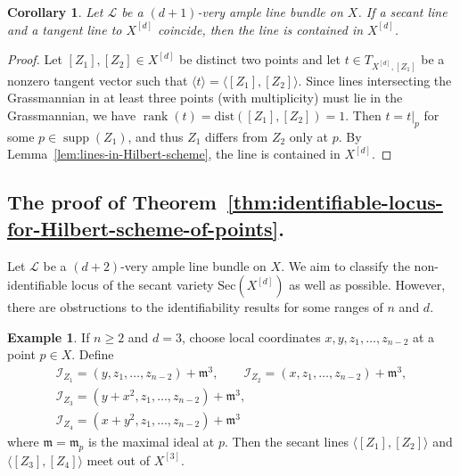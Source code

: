 \documentclass[a4paper]{amsart}
\numberwithin{equation}{section}
\theoremstyle{plain}
\newtheorem{cor}[thm]{Corollary}
\theoremstyle{definition}
\newtheorem{exa}[thm]{Example}
\theoremstyle{remark}
\numberwithin{figure}{section}
\numberwithin{table}{section}
\numberwithin{equation}{section}
\def \Ical {\mathcal{I}}
\def \Lcal {\mathcal{L}}
\def \mfr {\mathfrak{m}}
\DeclareMathOperator{\rank}{rank}
\DeclareMathOperator{\supp}{supp}
\begin{document}
\begin{cor} \label{cor:secant-and-tangent-are-not-the-same}
    Let $\Lcal$ be a $(d+1)$-very ample line bundle on $X$.
    If a secant line and a tangent line to $X^{[d]}$ coincide, then the line is contained in $X^{[d]}$.
\end{cor}

\begin{proof}
    Let $[Z_1],[Z_2] \in X^{[d]}$ be distinct two points and let $t \in T_{X^{[d]}, [Z_1]}$ be a nonzero tangent vector such that $\langle t \rangle = \langle [Z_1], [Z_2] \rangle$.
    Since lines intersecting the Grassmannian in at least three points (with multiplicity) must lie in the Grassmannian, we have $\rank(t) = \mathrm{dist}([Z_1], [Z_2]) = 1$.
    Then $t = t|_p$ for some $p \in \supp(Z_1)$, and thus $Z_1$ differs from $Z_2$ only at $p$.
    By Lemma~\ref{lem:lines-in-Hilbert-scheme}, the line is contained in $X^{[d]}$.
\end{proof}


\subsection{The proof of Theorem~\ref{thm:identifiable-locus-for-Hilbert-scheme-of-points}.} \label{subsec:proof-of-main-theorem-1}


Let $\Lcal$ be a $(d+2)$-very ample line bundle on $X$.
We aim to classify the non-identifiable locus of the secant variety $\mathrm{Sec}(X^{[d]})$ as well as possible.
However, there are obstructions to the identifiability results for some ranges of $n$ and $d$.

\begin{exa} \label{exa:Hilbert-scheme-of-three-points-weird}
    If $n \geq 2$ and $d=3$, choose local coordinates $x,y,z_1, \dots, z_{n-2}$ at a point $p \in X$.
    Define
     \begin{gather*}
      \Ical_{Z_1} = (y,z_1, \dots, z_{n-2}) + \mfr^3, \qquad \Ical_{Z_2} = (x,z_1, \dots, z_{n-2}) + \mfr^3, \\
      \Ical_{Z_3} = (y+x^2,z_1, \dots, z_{n-2}) + \mfr^3, \\
      \Ical_{Z_4} = (x+y^2,z_1, \dots, z_{n-2}) + \mfr^3
     \end{gather*}
    where $\mfr = \mfr_p$ is the maximal ideal at $p$.
    Then the secant lines $\langle [Z_1], [Z_2] \rangle$ and $\langle [Z_3], [Z_4] \rangle$ meet out of $X^{[3]}$.
\end{exa}
\end{document}
